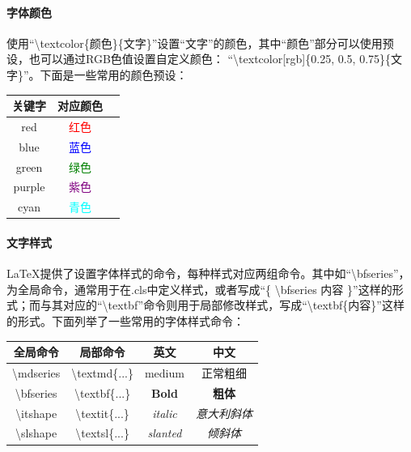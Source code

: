 \documentclass[AutoFakeBold]{ZafuThesis}
\begin{document}
\paragraph{字体颜色} 使用“\textbackslash textcolor\{颜色\}\{文字\}”设置“文字”的颜色，其中“颜色”部分可以使用预设，也可以通过RGB色值设置自定义颜色： “\textbackslash textcolor[rgb]\{0.25, 0.5, 0.75\}\{文字\}”。下面是一些常用的颜色预设：
\begin{table}[htbp]
  \centering
  \begin{tabular}{c c c}
    \toprule[1pt]
    关键字 & 对应颜色\\
    \hline
    red &  \textcolor{red}{红色} \\
    blue &  \textcolor{blue}{蓝色} \\
    green &  \textcolor{green}{绿色} \\
    purple &  \textcolor{purple}{紫色} \\
    cyan &  \textcolor{cyan}{青色} \\


    \toprule[1pt]
  \end{tabular}
\end{table}
\paragraph{文字样式} \LaTeX 提供了设置字体样式的命令，每种样式对应两组命令。其中如“\textbackslash bfseries”，为全局命令，通常用于在.cls中定义样式，或者写成“\{ \textbackslash bfseries 内容 \}”这样的形式；而与其对应的“\textbackslash textbf”命令则用于局部修改样式，写成“\textbackslash textbf\{内容\}”这样的形式。下面列举了一些常用的字体样式命令：
\begin{table}[htbp]
  \centering
  \begin{tabular}{c c c c}
    \toprule[1pt]
    全局命令 & 局部命令 & 英文 & 中文 \\
    \hline
    \textbackslash mdseries  & \textbackslash textmd\{...\} & \textmd{medium}& \textmd{正常粗细} \\
    \textbackslash bfseries  & \textbackslash textbf\{...\} & \textbf{Bold}& \textbf{粗体} \\
    \textbackslash itshape  & \textbackslash textit\{...\} & \textit{italic}& \textit{意大利斜体} \\
    \textbackslash slshape  & \textbackslash textsl\{...\} & \textsl{slanted}& \textsl{倾斜体} \\
    \toprule[1pt]
  \end{tabular}
\end{table}
\end{document}

